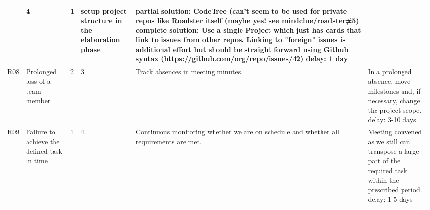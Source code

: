 \begin{center}
\begin{longtable}{|p{6mm}|p{30mm}|p{6mm}|p{8mm}|p{30mm}|p{64mm}|}
		& \cellcolor{green!50}4
		& \cellcolor{green!50}1
		& setup project structure in the elaboration phase
		& partial solution: \newline CodeTree (can't seem to be used for private repos like Roadster itself (maybe yes! see  mindclue/roadster\#5) \newline
		\newline complete solution: \newline Use a single Project which just has cards that link to issues from other repos. 
		Linking to "foreign" issues is additional effort but should be straight forward using Github syntax (https://github.com/org/repo/issues/42)
		\newline delay: 1 day \\ \hline
	R08 
		& Prolonged loss of a team member
		& \cellcolor{green!50}2
		& \cellcolor{green!50}3
		& Track absences in meeting minutes.
		& In a prolonged absence, move milestones and, if necessary, change the project scope. \newline delay: 3-10 days \\ \hline
		
	R09 
		& Failure to achieve the defined task in time
		& \cellcolor{green!50}1
		& \cellcolor{green!50}4
		& Continuous monitoring whether we are on schedule and whether all requirements are met. 
		& Meeting convened as we still can transpose a large part of the required task within the prescribed period. \newline delay: 1-5 days\\ \hline		
   \end{longtable}
\end{center}

